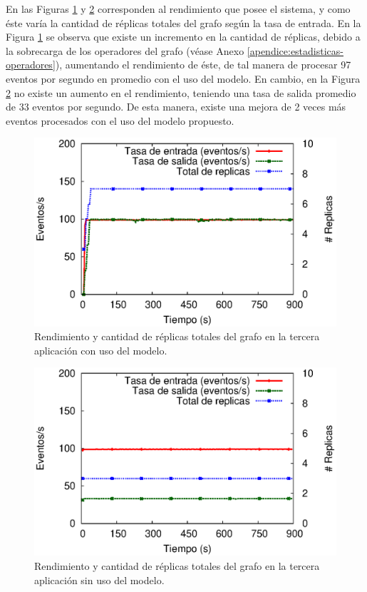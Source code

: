 En las Figuras \ref{fig:app3-processSystem-cm} y \ref{fig:app3-processSystem-sm} \normalsize{corresponden al rendimiento que posee el sistema, y como éste varía la cantidad de réplicas totales del grafo según la tasa de entrada.} En la Figura \ref{fig:app3-processSystem-cm} \normalsize{se observa que existe un incremento en la cantidad de réplicas, debido a la sobrecarga de los operadores del grafo} (véase Anexo \ref{apendice:estadisticas-operadores}), \normalsize{aumentando el rendimiento de éste, de tal manera de procesar 97 eventos por segundo en promedio con el uso del modelo. En cambio, en la Figura} \ref{fig:app3-processSystem-sm} \normalsize{no existe un aumento en el rendimiento, teniendo una tasa de salida promedio de 33 eventos por segundo. De esta manera, existe una mejora de 2 veces más eventos procesados con el uso del modelo propuesto.}

\begin{figure}[!ht]
	\centering
	\includegraphics[scale=0.7]{images/exp/app3/cm/logical/processSystem.eps}
    \caption{Rendimiento y cantidad de réplicas totales del grafo en la tercera aplicación con uso del modelo.}
	\label{fig:app3-processSystem-cm}
\end{figure}

\begin{figure}[!ht]
	\centering
	\includegraphics[scale=0.7]{images/exp/app3/sm/logical/processSystem.eps}
    \caption{Rendimiento y cantidad de réplicas totales del grafo en la tercera aplicación sin uso del modelo.}
	\label{fig:app3-processSystem-sm}
\end{figure}

